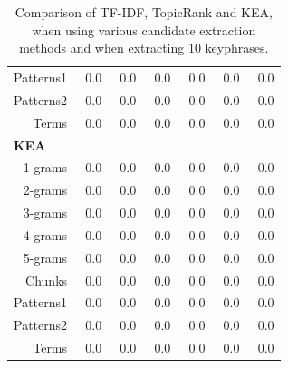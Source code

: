 \begin{table}[h]
\begin{tabular}{@{~}r@{~~}c@{~~}c@{~~}c@{~~}c@{~~}c@{~~}c@{~}}
        Patterns1 & ${~~}$0.0 & ${~~}$0.0 & ${~~}$0.0 & ${~~}$0.0 & ${~~}$0.0 & ${~~}$0.0\\
        Patterns2 & ${~~}$0.0 & ${~~}$0.0 & ${~~}$0.0 & ${~~}$0.0 & ${~~}$0.0 & ${~~}$0.0\\
        Terms & ${~~}$0.0 & ${~~}$0.0 & ${~~}$0.0 & ${~~}$0.0 & ${~~}$0.0 & ${~~}$0.0\\
        \multicolumn{1}{l}{\textbf{KEA}}\\
        1-grams & ${~~}$0.0 & ${~~}$0.0 & ${~~}$0.0 & ${~~}$0.0 & ${~~}$0.0 & ${~~}$0.0\\
        2-grams & ${~~}$0.0 & ${~~}$0.0 & ${~~}$0.0 & ${~~}$0.0 & ${~~}$0.0 & ${~~}$0.0\\
        3-grams & ${~~}$0.0 & ${~~}$0.0 & ${~~}$0.0 & ${~~}$0.0 & ${~~}$0.0 & ${~~}$0.0\\
        4-grams & ${~~}$0.0 & ${~~}$0.0 & ${~~}$0.0 & ${~~}$0.0 & ${~~}$0.0 & ${~~}$0.0\\
        5-grams & ${~~}$0.0 & ${~~}$0.0 & ${~~}$0.0 & ${~~}$0.0 & ${~~}$0.0 & ${~~}$0.0\\
        Chunks & ${~~}$0.0 & ${~~}$0.0 & ${~~}$0.0 & ${~~}$0.0 & ${~~}$0.0 & ${~~}$0.0\\
        Patterns1 & ${~~}$0.0 & ${~~}$0.0 & ${~~}$0.0 & ${~~}$0.0 & ${~~}$0.0 & ${~~}$0.0\\
        Patterns2 & ${~~}$0.0 & ${~~}$0.0 & ${~~}$0.0 & ${~~}$0.0 & ${~~}$0.0 & ${~~}$0.0\\
        Terms & ${~~}$0.0 & ${~~}$0.0 & ${~~}$0.0 & ${~~}$0.0 & ${~~}$0.0 & ${~~}$0.0\\
        \bottomrule
      \end{tabular}
      \caption{Comparison of TF-IDF, TopicRank and KEA, when using various
               candidate extraction methods and when extracting 10 keyphrases.
               \label{tab:keyphrase_extraction_results}}
    \end{table}

